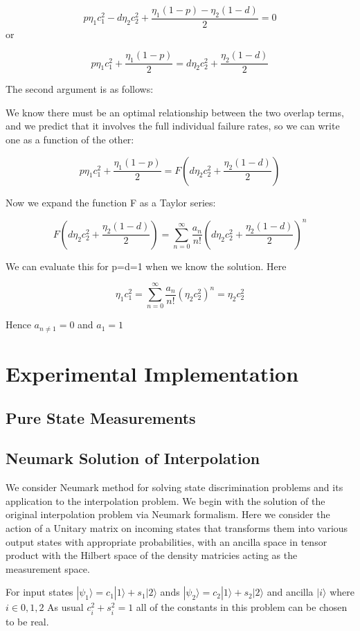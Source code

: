 \documentclass[12pt,oneside,english,reqno]{amsbook}
\numberwithin{section}{chapter}
\numberwithin{equation}{section}
\numberwithin{figure}{section}
\newcommand{\ke}[1]{|#1\rangle}
\begin{document}
\[   p\eta_1 c_1^2 - d\eta_2 c_2^2 + \frac{\eta_1(1-p) - \eta_2(1-d)}{2} = 0\] or

\[ p\eta_1 c_1^2  + \frac{\eta_1(1-p)}{2} = d\eta_2 c_2^2 + \frac{\eta_2(1-d)}{2} \]

The second argument is as follows:

We know there must be an optimal relationship between the two overlap terms, and we predict that it involves the full individual failure rates, so we can write one as a function of the other:

\[p\eta_1 c_1^2  + \frac{\eta_1(1-p)}{2} = F( d\eta_2 c_2^2 + \frac{\eta_2(1-d)}{2})\]

Now we expand the function F as a Taylor series:

\[ F( d\eta_2 c_2^2 + \frac{\eta_2(1-d)}{2} ) = \sum_{n=0}^{\infty} \frac{a_n}{n!}( d\eta_2 c_2^2 + \frac{\eta_2(1-d)}{2})^n\]

We can evaluate this for p=d=1 when we know the solution. Here

\[ \eta_1 c_1^2 =  \sum_{n=0}^{\infty} \frac{a_n}{n!}( \eta_2 c_2^2)^n = \eta_2 c_2^2\]

Hence $a_{n \neq 1} = 0$ and $a_1 = 1$

\chapter{Experimental Implementation}

\section{Pure State Measurements}
\section{Neumark Solution of Interpolation}

We consider Neumark method for solving state discrimination problems
and its application to the interpolation problem. We begin with the
solution of the original interpolation problem via Neumark formalism.
Here we consider the action of a Unitary matrix on incoming states
that transforms them into various output states with appropriate probabilities,
with an ancilla space in tensor product with the Hilbert space of
the density matricies acting as the measurement space.

For input states $\ke{\psi_{1}}=c_{1}\ke1+s_{1}\ke2$ ands $\ke{\psi_{2}}=c_{2}\ke1+s_{2}\ke2$
and ancilla $\ke i$ where $i\in0,1,2$ As usual $c_{i}^{2}+s_{i}^{2}=1$
all of the constants in this problem can be chosen to be real.
\end{document}
